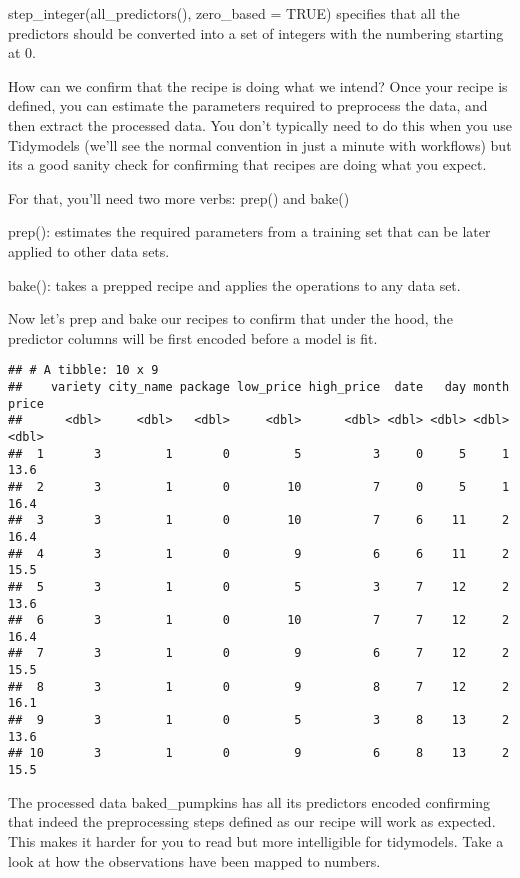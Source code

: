 \documentclass[
]{article}
\begin{document}
step\_integer(all\_predictors(), zero\_based = TRUE) specifies that all
the predictors should be converted into a set of integers with the
numbering starting at 0.

How can we confirm that the recipe is doing what we intend? Once your
recipe is defined, you can estimate the parameters required to
preprocess the data, and then extract the processed data. You don't
typically need to do this when you use Tidymodels (we'll see the normal
convention in just a minute with workflows) but its a good sanity check
for confirming that recipes are doing what you expect.

For that, you'll need two more verbs: prep() and bake()

prep(): estimates the required parameters from a training set that can
be later applied to other data sets.

bake(): takes a prepped recipe and applies the operations to any data
set.

Now let's prep and bake our recipes to confirm that under the hood, the
predictor columns will be first encoded before a model is fit.

\begin{verbatim}
## # A tibble: 10 x 9
##    variety city_name package low_price high_price  date   day month price
##      <dbl>     <dbl>   <dbl>     <dbl>      <dbl> <dbl> <dbl> <dbl> <dbl>
##  1       3         1       0         5          3     0     5     1  13.6
##  2       3         1       0        10          7     0     5     1  16.4
##  3       3         1       0        10          7     6    11     2  16.4
##  4       3         1       0         9          6     6    11     2  15.5
##  5       3         1       0         5          3     7    12     2  13.6
##  6       3         1       0        10          7     7    12     2  16.4
##  7       3         1       0         9          6     7    12     2  15.5
##  8       3         1       0         9          8     7    12     2  16.1
##  9       3         1       0         5          3     8    13     2  13.6
## 10       3         1       0         9          6     8    13     2  15.5
\end{verbatim}

The processed data baked\_pumpkins has all its predictors encoded
confirming that indeed the preprocessing steps defined as our recipe
will work as expected. This makes it harder for you to read but more
intelligible for tidymodels. Take a look at how the observations have
been mapped to numbers.
\end{document}
